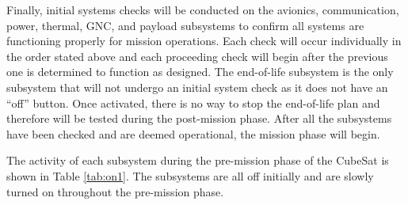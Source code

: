 Finally, initial systems checks will be conducted on the avionics, communication, power, thermal, GNC, and payload subsystems to confirm all systems are functioning properly for mission operations. Each check will occur individually in the order stated above and each proceeding check will begin after the previous one is determined to function as designed. The end-of-life subsystem is the only subsystem that will not undergo an initial system check as it does not have an “off” button.  Once activated, there is no way to stop the end-of-life plan and therefore will be tested during the post-mission phase. After all the subsystems have been checked and are deemed operational, the mission phase will begin. 

The activity of each subsystem during the pre-mission phase of the CubeSat is shown in Table \ref{tab:on1}. The subsystems are all off initially and are slowly turned on throughout the pre-mission phase. 

